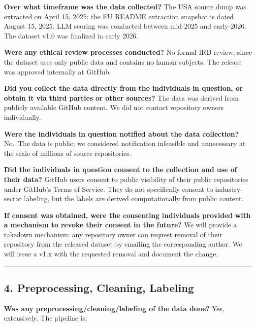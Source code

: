 \textbf{Over what timeframe was the data collected?}
The USA source dump was extracted on April 15, 2025; the EU README
extraction snapshot is dated August 15, 2025. LLM scoring was
conducted between mid-2025 and early-2026. The dataset v1.0 was
finalized in early 2026.

\textbf{Were any ethical review processes conducted?}
No formal IRB review, since the dataset uses only public data and
contains no human subjects. The release was approved internally at
GitHub.

\textbf{Did you collect the data directly from the individuals in question,
or obtain it via third parties or other sources?}
The data was derived from publicly available GitHub content. We did
not contact repository owners individually.

\textbf{Were the individuals in question notified about the data collection?}
No.~The data is public; we considered notification infeasible and
unnecessary at the scale of millions of source repositories.

\textbf{Did the individuals in question consent to the collection and use of
their data?}
GitHub users consent to public visibility of their public repositories
under GitHub's Terms of Service. They do not specifically consent to
industry-sector labeling, but the labels are derived computationally
from public content.

\textbf{If consent was obtained, were the consenting individuals provided
with a mechanism to revoke their consent in the future?}
We will provide a takedown mechanism: any repository owner can request
removal of their repository from the released dataset by emailing the
corresponding author. We will issue a v1.x with the requested removal
and document the change.

\begin{center}\rule{0.5\linewidth}{0.5pt}\end{center}

\hypertarget{preprocessing-cleaning-labeling}{%
\subsection{4. Preprocessing, Cleaning, Labeling}\label{preprocessing-cleaning-labeling}}

\textbf{Was any preprocessing/cleaning/labeling of the data done?}
Yes, extensively. The pipeline is:

